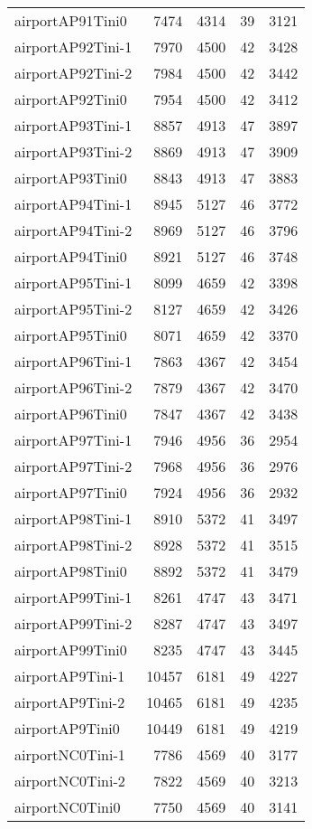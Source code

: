 \begin{longtable}{lrrrr}
airportAP91Tini0 & 7474 & 4314 & 39 & 3121 \\
airportAP92Tini-1 & 7970 & 4500 & 42 & 3428 \\
airportAP92Tini-2 & 7984 & 4500 & 42 & 3442 \\
airportAP92Tini0 & 7954 & 4500 & 42 & 3412 \\
airportAP93Tini-1 & 8857 & 4913 & 47 & 3897 \\
airportAP93Tini-2 & 8869 & 4913 & 47 & 3909 \\
airportAP93Tini0 & 8843 & 4913 & 47 & 3883 \\
airportAP94Tini-1 & 8945 & 5127 & 46 & 3772 \\
airportAP94Tini-2 & 8969 & 5127 & 46 & 3796 \\
airportAP94Tini0 & 8921 & 5127 & 46 & 3748 \\
airportAP95Tini-1 & 8099 & 4659 & 42 & 3398 \\
airportAP95Tini-2 & 8127 & 4659 & 42 & 3426 \\
airportAP95Tini0 & 8071 & 4659 & 42 & 3370 \\
airportAP96Tini-1 & 7863 & 4367 & 42 & 3454 \\
airportAP96Tini-2 & 7879 & 4367 & 42 & 3470 \\
airportAP96Tini0 & 7847 & 4367 & 42 & 3438 \\
airportAP97Tini-1 & 7946 & 4956 & 36 & 2954 \\
airportAP97Tini-2 & 7968 & 4956 & 36 & 2976 \\
airportAP97Tini0 & 7924 & 4956 & 36 & 2932 \\
airportAP98Tini-1 & 8910 & 5372 & 41 & 3497 \\
airportAP98Tini-2 & 8928 & 5372 & 41 & 3515 \\
airportAP98Tini0 & 8892 & 5372 & 41 & 3479 \\
airportAP99Tini-1 & 8261 & 4747 & 43 & 3471 \\
airportAP99Tini-2 & 8287 & 4747 & 43 & 3497 \\
airportAP99Tini0 & 8235 & 4747 & 43 & 3445 \\
airportAP9Tini-1 & 10457 & 6181 & 49 & 4227 \\
airportAP9Tini-2 & 10465 & 6181 & 49 & 4235 \\
airportAP9Tini0 & 10449 & 6181 & 49 & 4219 \\
airportNC0Tini-1 & 7786 & 4569 & 40 & 3177 \\
airportNC0Tini-2 & 7822 & 4569 & 40 & 3213 \\
airportNC0Tini0 & 7750 & 4569 & 40 & 3141 \\

\end{longtable}
